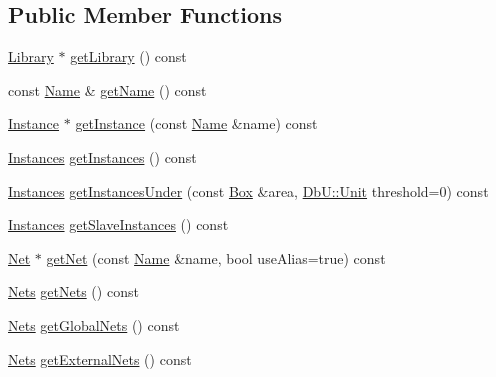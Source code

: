 \subsection*{Public Member Functions}
\begin{DoxyCompactItemize}
\item 
\mbox{\hyperlink{classHurricane_1_1Library}{Library}} $\ast$ \mbox{\hyperlink{classHurricane_1_1Cell_aa84b97773160a28d3dd69df1e261eecf}{get\+Library}} () const
\item 
const \mbox{\hyperlink{classHurricane_1_1Name}{Name}} \& \mbox{\hyperlink{classHurricane_1_1Cell_a01cd4bba972d484496fd297648b8fa0c}{get\+Name}} () const
\item 
\mbox{\hyperlink{classHurricane_1_1Instance}{Instance}} $\ast$ \mbox{\hyperlink{classHurricane_1_1Cell_abaf178b24734de37cf0ac31918c096ac}{get\+Instance}} (const \mbox{\hyperlink{classHurricane_1_1Name}{Name}} \&name) const
\item 
\mbox{\hyperlink{namespaceHurricane_ac9436b03a2926f34ad6863deae2baadc}{Instances}} \mbox{\hyperlink{classHurricane_1_1Cell_aa85b3992431b672827167c5d9cb622f2}{get\+Instances}} () const
\item 
\mbox{\hyperlink{namespaceHurricane_ac9436b03a2926f34ad6863deae2baadc}{Instances}} \mbox{\hyperlink{classHurricane_1_1Cell_a3af933175d318b205d94adaf92ba0499}{get\+Instances\+Under}} (const \mbox{\hyperlink{classHurricane_1_1Box}{Box}} \&area, \mbox{\hyperlink{group__DbUGroup_ga4fbfa3e8c89347af76c9628ea06c4146}{Db\+U\+::\+Unit}} threshold=0) const
\item 
\mbox{\hyperlink{namespaceHurricane_ac9436b03a2926f34ad6863deae2baadc}{Instances}} \mbox{\hyperlink{classHurricane_1_1Cell_a7e51bee5db73dd44f788e591a5c175c8}{get\+Slave\+Instances}} () const
\item 
\mbox{\hyperlink{classHurricane_1_1Net}{Net}} $\ast$ \mbox{\hyperlink{classHurricane_1_1Cell_a70f06abd224895aeeeeb042365dbf48a}{get\+Net}} (const \mbox{\hyperlink{classHurricane_1_1Name}{Name}} \&name, bool use\+Alias=true) const
\item 
\mbox{\hyperlink{namespaceHurricane_a3404a8b17130a1824f4a281704b04df7}{Nets}} \mbox{\hyperlink{classHurricane_1_1Cell_a8b4728abe83e9ec21d7bee1154218279}{get\+Nets}} () const
\item 
\mbox{\hyperlink{namespaceHurricane_a3404a8b17130a1824f4a281704b04df7}{Nets}} \mbox{\hyperlink{classHurricane_1_1Cell_a1512722d821edc18ff38e673862cd108}{get\+Global\+Nets}} () const
\item 
\mbox{\hyperlink{namespaceHurricane_a3404a8b17130a1824f4a281704b04df7}{Nets}} \mbox{\hyperlink{classHurricane_1_1Cell_aa80f3345db8c1395fa04a50737208793}{get\+External\+Nets}} () const

\end{DoxyCompactItemize}
